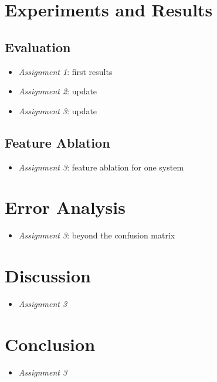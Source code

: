 \documentclass[11pt]{article}
\begin{document}
\section{Experiments and Results}

\subsection{Evaluation}

\begin{itemize}
    \item [] \textit{Assignment 1}: first results 
    \item [] \textit{Assignment 2}: update
    \item [] \textit{Assignment 3}: update
\end{itemize}

\subsection{Feature Ablation}

\begin{itemize}
    \item [] \textit{Assignment 3}: feature ablation for one system
\end{itemize}


\section{Error Analysis}

\begin{itemize}
    \item [] \textit{Assignment 3}: beyond the confusion matrix
\end{itemize}


\section{Discussion}

\begin{itemize}
    \item [] \textit{Assignment 3}
\end{itemize}

\section{Conclusion}

\begin{itemize}
    \item [] \textit{Assignment 3}
\end{itemize}
\end{document}
